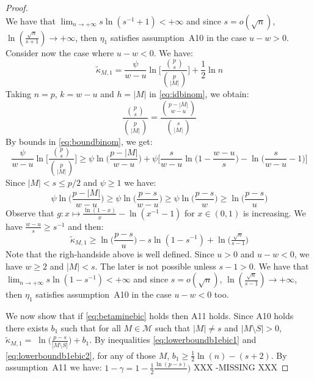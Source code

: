 \documentclass[aos]{imsart}
\theoremstyle{plain}
\newcommand{\M}{\mathcal{M}}
\begin{document}
\begin{proof}
\begin{equation}
\end{equation}
 We have that $\lim_{n\to+\infty}s\ln(s^{-1}+1)< +\infty$ and since $s=o(\sqrt{n})$, $\ln(\tfrac{\sqrt{n}}{s+1}) \to +\infty$, then $\eta_1$ satisfies assumption~A10 in the case $u-w>0$.\\
 Consider now the case where $u-w<0$. We have:
     \begin{equation*}
        \tilde{\kappa}_{M,1}=\frac{\psi}{w-u}\ln\bigg[\frac{{p \choose s}}{{p \choose |M|}}\bigg]+ \frac{1}{2}\ln n
    \end{equation*}
 Taking $n=p$, $k=w-u$ and $h=|M|$ in \eqref{eq:idbinom}, we obtain:
     \begin{equation}
        \frac{{p \choose s}}{{p \choose |M|}}=
        \frac{{p - |M| \choose w-u}}{{s \choose |M|}}
    \end{equation}
By bounds in \eqref{eq:boundbinom}, we get:
$$ \frac{\psi}{w-u}\ln\bigg[\frac{{p \choose s}}{{p \choose |M|}}\bigg] \geq \psi\ln\bigg(\frac{p-|M|}{w-u}\bigg)+\psi\bigg[\frac{s}{w-u}\ln\bigg(1-\frac{w-u}{s}\bigg) -\ln\bigg(\frac{s}{w-u}-1\bigg) \bigg]$$
Since $|M|<s\leq p/2$ and $\psi\geq 1$ we have:
$$\psi\ln\bigg(\frac{p-|M|}{w-u}\bigg) \geq \psi\ln\bigg(\frac{p-s}{w-u}\bigg) \geq \psi\ln\bigg(\frac{p-s}{w}\bigg)\geq \ln\bigg(\frac{p-s}{u}\bigg)$$
Observe that $g:x \mapsto \frac{\ln(1-x)}{x}-\ln({x}^{-1}-1)$ for $x\in(0,1)$ is increasing. We have $\frac{w-u}{s} \geq s^{-1}$ and then: 
\begin{equation}
        \tilde{\kappa}_{M,1} \geq \ln\big(\frac{p-s}{u}\big)-s\ln(1-s^{-1})+ \ln \big(\tfrac{\sqrt{n}}{s-1}\big)
\end{equation}
Note that the righ-handside above is well defined. Since $u>0$ and $u-w<0$, we have $w\geq2$ and $|M|<s$. The later is not possible unless $s-1>0$. We have that $\lim_{n\to+\infty}s\ln(1-s^{-1})< +\infty$ and since $s=o(\sqrt{n})$, $\ln(\tfrac{\sqrt{n}}{s-1}) \to +\infty$, then $\eta_1$ satisfies assumption~A10 in the case $u-w<0$ too.

 We now show that if \eqref{eq:betaminebic} holds then A11 holds. Since A10 holds there exists $b_1$ such that for all $M\in\M$ such that $|M|\neq s$ and $|M\setminus S|>0$, $\tilde{\kappa}_{M, 1} =\;\ln\bigg(\frac{p-s}{|M \setminus S| }\bigg) + b_{1}$. By inequalities \eqref{eq:lowerboundb1ebic1} and \eqref{eq:lowerboundb1ebic2}, for any of those $M$, $b_1 \geq \tfrac{1}{2}\ln(n)-(s+2)$. By assumption~A11 we have: $1-\gamma=1-\frac{1}{2}\frac{\ln(p-s)}{})$ XXX -MISSING XXX
\end{proof}
\end{document}
